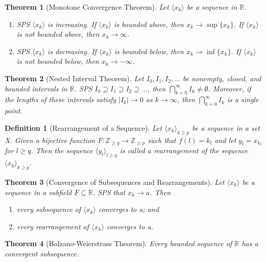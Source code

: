 \documentclass[11pt, oneside]{book}
\theoremstyle{break}
\newtheorem{thm}{Theorem}[section]
\newtheorem{defn}{Definition}[section]
\newcommand{\bb}[1]{\mathbb{#1}}		%
\begin{document}
\begin{thm}[Monotone Convergence Theorem]
	Let $\langle x_k \rangle$ be a sequence in $\bb{R}$.
	\begin{enumerate}
		\item SPS $\langle x_k \rangle$ is increasing. If $\langle x_k \rangle$ is bounded above, then $x_k \to \sup \{x_k\}$. If $\langle x_k \rangle$ is not bounded above, then $x_k \to \infty$.
		\item SPS $\langle x_k \rangle$ is decreasing. If $\langle x_k \rangle$ is bounded below, then $x_k \to \inf \{x_k\}$. If $\langle x_k \rangle$ is not bounded below, then $x_k \to -\infty$.
	\end{enumerate}
\end{thm}

\begin{thm}[Nested Interval Theorem]
	Let $I_0, I_1, I_2, ...$ be nonempty, closed, and bounded intervals in $\bb{R}$. SPS $I_0 \supseteq I_1 \supseteq I_2 \supseteq \hdots$, then $\bigcap_{k = 0}^\infty I_k \neq \emptyset$. Moreover, if the lengths of these intervals satisfy $|I_k| \to 0$ as $k \to \infty$, then $\bigcap_{k = 0}^\infty I_k$ is a single point.
\end{thm}

\begin{defn}[Rearrangement of a Sequence]
	Let $\langle x_k \rangle_{k \geq p}$ be a sequence in a set X. Given a bijective function $F: \bb{Z}_{\geq q} \to \bb{Z}_{\geq p}$ such that $f(l) = k_l$ and let $y_l = x_{k_l}$ for $l \geq q$. Then the sequence $\langle y_l \rangle_{l \geq q}$ is called a rearrangement of the sequence $\langle x_k \rangle_{k \geq p}$.
\end{defn}

\begin{thm}[Convergence of Subsequences and Rearrangements]
	Let $\langle x_k \rangle$ be a sequence in a subfield $F \subseteq \bb{R}$. SPS that $x_k \to a$. Then
	\begin{enumerate}
		\item every subsequence of $\langle x_k \rangle$ converges to a; and
		\item every rearrangement of $\langle x_k \rangle$ converges to a.
	\end{enumerate}
\end{thm}

\begin{thm}[Bolzano-Weierstrass Theorem]
	Every bounded sequence of $\bb{R}$ has a convergent subsequence.
\end{thm}
\end{document}
